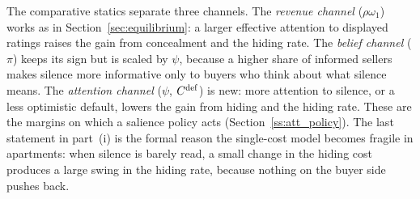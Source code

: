 The comparative statics separate three channels. The \emph{revenue channel} ($\rho\omega_1$) works as in Section~\ref{sec:equilibrium}: a larger effective attention to displayed ratings raises the gain from concealment and the hiding rate. The \emph{belief channel} ($\pi$) keeps its sign but is scaled by $\psi$, because a higher share of informed sellers makes silence more informative only to buyers who think about what silence means. The \emph{attention channel} ($\psi$, $C^{\rm def}$) is new: more attention to silence, or a less optimistic default, lowers the gain from hiding and the hiding rate. These are the margins on which a salience policy acts (Section~\ref{ss:att_policy}). The last statement in part~(i) is the formal reason the single-cost model becomes fragile in apartments: when silence is barely read, a small change in the hiding cost produces a large swing in the hiding rate, because nothing on the buyer side pushes back.
